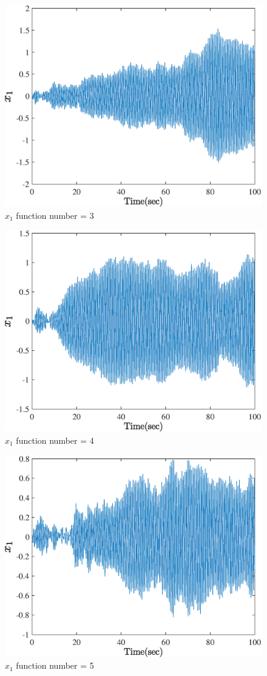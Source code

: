   \begin{figure}[H] 
  	\caption{$x_1$ function number = 3} 
  	\centering 
  	\includegraphics[width=12cm]{../Figure/Q5/part_a/3} 
  \end{figure}
  \begin{figure}[H] 
  	\caption{$x_1$ function number = 4} 
  	\centering 
  	\includegraphics[width=12cm]{../Figure/Q5/part_a/4} 
  \end{figure}
  \begin{figure}[H] 
  	\caption{$x_1$ function number = 5} 
  	\centering 
  	\includegraphics[width=12cm]{../Figure/Q5/part_a/5} 
  \end{figure}
